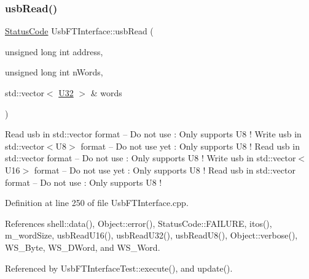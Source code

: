 \subsubsection{\texorpdfstring{usb\+Read()}{usbRead()}}
{\footnotesize\ttfamily \hyperlink{classStatusCode}{Status\+Code} Usb\+F\+T\+Interface\+::usb\+Read (\begin{DoxyParamCaption}\item[{unsigned long int}]{address,  }\item[{unsigned long int}]{n\+Words,  }\item[{std\+::vector$<$ \hyperlink{classUsbFTInterface_aee2201fe4d977aa03568fa8dbacc39ba}{U32} $>$ \&}]{words }\end{DoxyParamCaption})}

Read usb in std\+::vector format -- Do not use \+: Only supports U8 ! Write usb in std\+::vector$<$\+U8$>$ format -- Do not use yet \+: Only supports U8 ! Read usb in std\+::vector format -- Do not use \+: Only supports U8 ! Write usb in std\+::vector$<$\+U16$>$ format -- Do not use yet \+: Only supports U8 ! Read usb in std\+::vector format -- Do not use \+: Only supports U8 ! 

Definition at line 250 of file Usb\+F\+T\+Interface.\+cpp.



References shell\+::data(), Object\+::error(), Status\+Code\+::\+F\+A\+I\+L\+U\+RE, itos(), m\+\_\+word\+Size, usb\+Read\+U16(), usb\+Read\+U32(), usb\+Read\+U8(), Object\+::verbose(), W\+S\+\_\+\+Byte, W\+S\+\_\+\+D\+Word, and W\+S\+\_\+\+Word.



Referenced by Usb\+F\+T\+Interface\+Test\+::execute(), and update().


